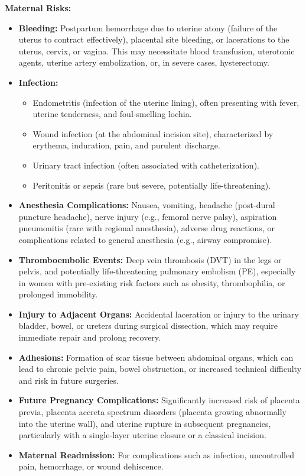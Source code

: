 \textbf{Maternal Risks:}
\begin{itemize}
  \item \textbf{Bleeding:} Postpartum hemorrhage due to uterine atony (failure of the uterus to contract effectively), placental site bleeding, or lacerations to the uterus, cervix, or vagina. This may necessitate blood transfusion, uterotonic agents, uterine artery embolization, or, in severe cases, hysterectomy.
  \item \textbf{Infection:}
  \begin{itemize}
    \item Endometritis (infection of the uterine lining), often presenting with fever, uterine tenderness, and foul-smelling lochia.
    \item Wound infection (at the abdominal incision site), characterized by erythema, induration, pain, and purulent discharge.
    \item Urinary tract infection (often associated with catheterization).
    \item Peritonitis or sepsis (rare but severe, potentially life-threatening).
  \end{itemize}
  \item \textbf{Anesthesia Complications:} Nausea, vomiting, headache (post-dural puncture headache), nerve injury (e.g., femoral nerve palsy), aspiration pneumonitis (rare with regional anesthesia), adverse drug reactions, or complications related to general anesthesia (e.g., airway compromise).
  \item \textbf{Thromboembolic Events:} Deep vein thrombosis (DVT) in the legs or pelvis, and potentially life-threatening pulmonary embolism (PE), especially in women with pre-existing risk factors such as obesity, thrombophilia, or prolonged immobility.
  \item \textbf{Injury to Adjacent Organs:} Accidental laceration or injury to the urinary bladder, bowel, or ureters during surgical dissection, which may require immediate repair and prolong recovery.
  \item \textbf{Adhesions:} Formation of scar tissue between abdominal organs, which can lead to chronic pelvic pain, bowel obstruction, or increased technical difficulty and risk in future surgeries.
  \item \textbf{Future Pregnancy Complications:} Significantly increased risk of placenta previa, placenta accreta spectrum disorders (placenta growing abnormally into the uterine wall), and uterine rupture in subsequent pregnancies, particularly with a single-layer uterine closure or a classical incision.
  \item \textbf{Maternal Readmission:} For complications such as infection, uncontrolled pain, hemorrhage, or wound dehiscence.
\end{itemize}

